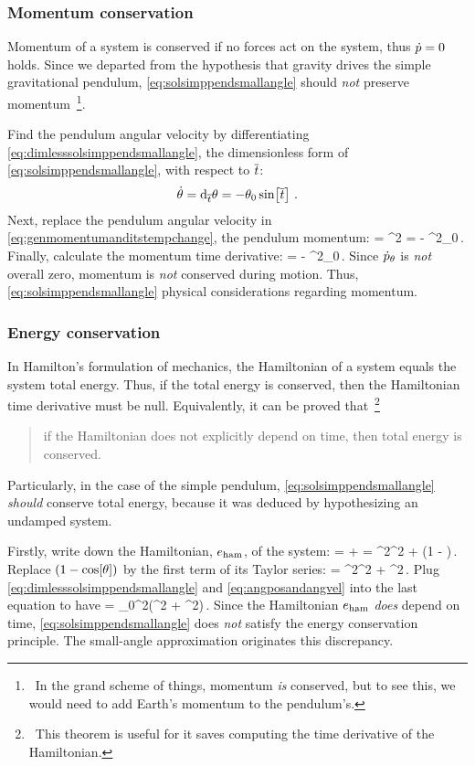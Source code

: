\subsubsection{Momentum conservation}
Momentum of a system is conserved if no forces act on the system, thus $\dot{p} = 0$ holds. Since we departed from the hypothesis that gravity drives the simple gravitational pendulum, \cref{eq:solsimppendsmallangle} should \emph{not} preserve momentum~\footnote{~In the grand scheme of things, momentum \emph{is} conserved, but to see this, we would need to add Earth's momentum to the pendulum's.}.

Find the pendulum angular velocity by differentiating \cref{eq:dimlesssolsimppendsmallangle}, the dimensionless form of \cref{eq:solsimppendsmallangle}, with respect to $\overline{t}$:
\begin{equation}\label{eq:angposandangvel}
\dot{\theta} = \text{d}_{\overline{t}}\theta = -\theta_0\sin\!\left[{\overline{t}}\right]\,.
\end{equation}
Next, replace the pendulum angular velocity in \cref{eq:genmomentumanditstempchange}, the pendulum momentum:
\beq
\igmom\angpos = \mass\length^2\angvel 
              = - \mass\length^2\angpos_0\sin{}\,.
\eeq
Finally, calculate the momentum time derivative:
\beq
\dtigmom\angpos = - \mass\length^2\angpos_0\cos{}\,.
\eeq
Since ${\dot{p}}_{\theta}$ is \emph{not} overall zero, momentum is \emph{not} conserved during motion. Thus, \cref{eq:solsimppendsmallangle} physical considerations regarding momentum.


\subsubsection{Energy conservation}
In Hamilton's formulation of mechanics, the Hamiltonian of a system equals the system total energy. Thus, if the total energy is conserved, then the Hamiltonian time derivative must be null. Equivalently, it can be proved that~\footnote{~This theorem is useful for it saves computing the time derivative of the Hamiltonian.}
\begin{quote}
if the Hamiltonian does not explicitly depend on time, then total energy is conserved. 
\end{quote}
Particularly, in the case of the simple pendulum, \cref{eq:solsimppendsmallangle} \emph{should} conserve total energy, because it was deduced by hypothesizing an undamped system.

Firstly, write down the Hamiltonian, $e_\text{ham}$, of the system:
\beq
\ham = \ken + \pen 
     = \mass\length^2\angvel^2 + \mass\grav\length\left(1 - \cos\vat{\angpos}\right)\,. 
\eeq
Replace $\left(1 - \cos\!\left[{\theta}\right]\right)$ by the first term of its Taylor series:
\ham = \mass\length^2\angvel^2 + \mass\grav\length\angpos^2\,. 
\eeq
Plug \cref{eq:dimlesssolsimppendsmallangle} and \cref{eq:angposandangvel} into the last equation to have
\ham = \mass\length\angpos_0^2\left(\length\sin^2 + \grav\cos^2\right)\,.
\eeq
Since the Hamiltonian $e_\text{ham}$ \emph{does} depend on time, \cref{eq:solsimppendsmallangle} does \emph{not} satisfy the energy conservation principle. The small-angle approximation originates this discrepancy.



